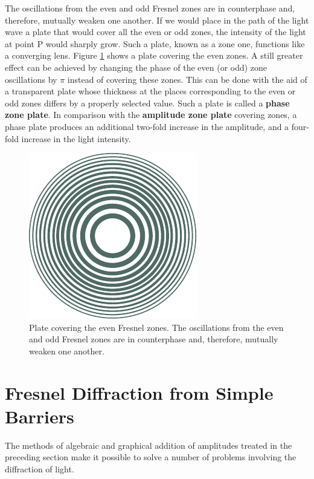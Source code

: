 The oscillations from the even and odd Fresnel zones are in counterphase and, therefore, mutually weaken one another.
If we would place in the path of the light wave a plate that would cover all the even or odd zones, the intensity of the light at point P would sharply grow.
Such a plate, known as a zone one, functions like a converging lens.
Figure \ref{fig:18_9} shows a plate covering the
even zones.
A still greater effect can be achieved by changing the phase of the even (or odd) zone oscillations by $\pi$ instead of covering these
zones.
This can be done with the aid of a transparent plate whose thickness at the places corresponding
to the even or odd zones differs by a properly selected value.
Such a plate is called a \textbf{phase zone plate}.
In comparison with the \textbf{amplitude zone plate} covering zones, a phase plate produces an additional two-fold increase in the amplitude, and a four-fold increase in the light intensity.

\begin{figure}[t]
	\begin{center}
		\includegraphics[scale=1]{figures/ch_18/fig_18_9.pdf}
        \caption[]{Plate covering the even Fresnel zones. The oscillations from the even and odd Fresnel zones are in counterphase and, therefore, mutually weaken one another.}
		\label{fig:18_9}
	\end{center}
	\vspace{-0.8cm}
\end{figure}

\section{Fresnel Diffraction from Simple Barriers}\label{sec:18_4}

The methods of algebraic and graphical addition of amplitudes treated in the preceding section make it possible to solve a number of problems involving the diffraction of light.

